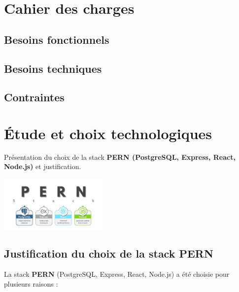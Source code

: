 \documentclass[12pt,a4paper]{report}
\begin{document}
\chapter{Cahier des charges}
\section{Besoins fonctionnels}
\section{Besoins techniques}
\section{Contraintes}

\chapter{Étude et choix technologiques}

Présentation du choix de la stack \textbf{PERN (PostgreSQL, Express, React, Node.js)} et justification.  

\begin{center}
    \includegraphics[width=0.4\textwidth]{1_ptqverAyBpdfUDhrs2g_3A.jpg} %
\end{center}

\section*{Justification du choix de la stack PERN}

La stack \textbf{PERN} (PostgreSQL, Express, React, Node.js) a été choisie pour plusieurs raisons :  
\end{document}
